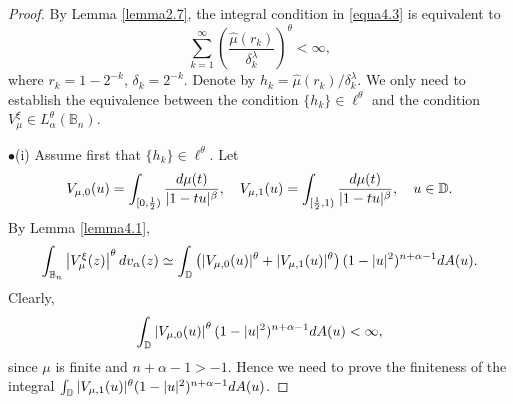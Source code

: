 \documentclass[10pt,a4paper]{amsart}
\begin{document}
\begin{proof}
By Lemma \ref{lemma2.7}, the integral condition in \eqref{equa4.3} is equivalent to
\[
    \sum_{k=1}^{\infty}\left(\frac{\hat{\mu}(r_k)}{\delta_k^{\lambda}}\right)^{\theta}<\infty,
\]
where $r_k=1-2^{-k}$, $\delta_k=2^{-k}$. Denote by $h_k=\hat{\mu}(r_k)/\delta_k^{\lambda}$. We only need to establish the equivalence between the condition   $\{h_k\}\in \ell^{\theta}$  and the condition $V_{\mu}^{\xi}\in L_{\alpha}^{\theta}(\mathbb{B}_n)$.

$\bullet$(i) Assume first that   $\{h_k\}\in \ell^{\theta}$. Let
\[
    V_{\mu,0}(u)=\int_{[0,\frac{1}{2})}\frac{{\rm d}\mu(t)}{|1-tu|^{\beta}},\quad V_{\mu,1}(u)=\int_{[\frac{1}{2}, 1)}\frac{{\rm d}\mu(t)}{|1-tu|^{\beta}},\quad u\in\mathbb{D}.
\]
By Lemma \ref{lemma4.1}, 
\begin{equation*}
\int_{\mathbb{B}_n}\left|V_{\mu}^{\xi}(z)\right|^{\theta}{\rm d}v_{\alpha}(z)\simeq \int_{\mathbb{D}}\left(|V_{\mu,0}(u)|^{\theta}+|V_{\mu,1}(u)|^{\theta}\right)(1-|u|^2)^{n+\alpha-1}{\rm d}A(u).
\end{equation*}
Clearly, 
\[
    \int_{\mathbb{D}}\left|V_{\mu,0}(u)\right|^{\theta}(1-|u|^2)^{n+\alpha-1}{\rm d}A(u)<\infty,
\]
since $\mu$ is finite and $n+\alpha-1>-1$. Hence we need to prove the finiteness of the integral $\int_{\mathbb{D}}|V_{\mu,1}(u)|^{\theta}(1-|u|^2)^{n+\alpha-1}{\rm d}A(u)$.


\end{proof}
\end{document}
